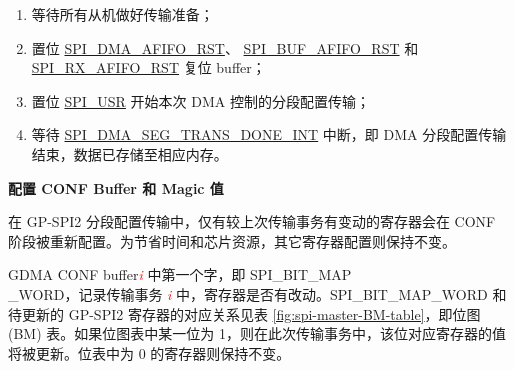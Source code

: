 \documentclass[main\_\_CN.tex]{subfiles}
\begin{document}
\begin{enumerate}
   \item 等待所有从机做好传输准备；

    \item 置位  \hyperref[fielddesc:SPIDMAAFIFORST]{SPI\_DMA\_AFIFO\_RST}、 \hyperref[fielddesc:SPIBUFAFIFORST]{SPI\_BUF\_AFIFO\_RST} 和  \hyperref[fielddesc:SPIRXAFIFORST]{SPI\_RX\_AFIFO\_RST} 复位 buffer；

   \item 置位  \hyperref[fielddesc:SPIUSR]{SPI\_USR} 开始本次 DMA 控制的分段配置传输；

   \item 等待  \hyperref[int:SPIDMASEGTRANSDONEINT]{SPI\_DMA\_SEG\_TRANS\_DONE\_INT} 中断，即 DMA 分段配置传输结束，数据已存储至相应内存。
 \end{enumerate}

\textbf{配置 CONF Buffer 和 Magic 值}\label{sec:SCT-CONF-Buffer}

在 GP-SPI2 分段配置传输中，仅有较上次传输事务有变动的寄存器会在 CONF 阶段被重新配置。为节省时间和芯片资源，其它寄存器配置则保持不变。

GDMA CONF buffer\textcolor{red}{\it i} 中第一个字，即 SPI\_BIT\_MAP\\\_WORD，记录传输事务 \textcolor{red}{\it i} 中，寄存器是否有改动。SPI\_BIT\_MAP\_WORD 和待更新的 GP-SPI2 寄存器的对应关系见表  \ref{fig:spi-master-BM-table}，即位图 (BM) 表。如果位图表中某一位为 1，则在此次传输事务中，该位对应寄存器的值将被更新。位表中为 0 的寄存器则保持不变。
\end{document}
